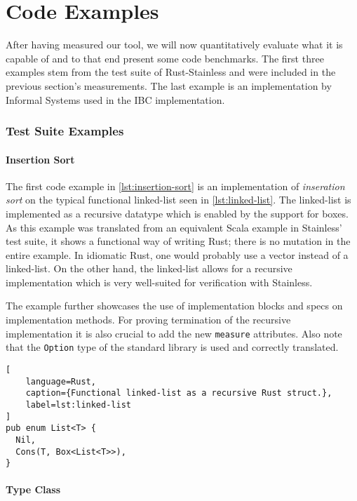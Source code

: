 


\section{Code Examples}

After having measured our tool, we will now quantitatively evaluate what it is
capable of and to that end present some code benchmarks. The first three
examples stem from the test suite of Rust-Stainless and were included in the
previous section's measurements. The last example is an implementation by
Informal Systems used in the IBC implementation.

\subsubsection{Test Suite Examples}

\paragraph{Insertion Sort}

The first code example in \autoref{lst:insertion-sort} is an implementation of
\emph{inseration sort} on the typical functional linked-list seen in
\autoref{lst:linked-list}. The linked-list is implemented as a recursive
datatype which is enabled by the support for boxes. As this example was
translated  from an equivalent Scala example in Stainless' test suite, it shows
a functional way of writing Rust; there is no mutation in the entire example. In
idiomatic Rust, one would probably use a vector instead of a linked-list. On the
other hand, the linked-list allows for a recursive implementation which is very
well-suited for verification with Stainless.

The example further showcases the use of implementation blocks and specs on
implementation methods. For proving termination of the recursive implementation
it is also crucial to add the new \lstinline!measure! attributes. Also note that
the \lstinline!Option! type of  the standard library is used and correctly
translated.

\begin{lstlisting}[
    language=Rust,
    caption={Functional linked-list as a recursive Rust struct.},
    label=lst:linked-list
]
pub enum List<T> {
  Nil,
  Cons(T, Box<List<T>>),
}
\end{lstlisting}

\paragraph{Type Class}

